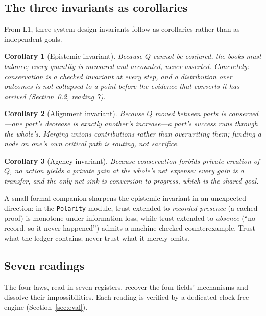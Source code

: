 \documentclass[11pt]{article}
\newtheorem{corollary}{Corollary}
\begin{document}
\subsection{The three invariants as corollaries}
\label{sec:invariants}

From L1, three system-design invariants follow as corollaries rather
than as independent goals.

\begin{corollary}[Epistemic invariant]
Because $Q$ cannot be conjured, the books must balance; every quantity
is measured and accounted, never asserted. Concretely: conservation is
a checked invariant at every step, and a distribution over outcomes is
not collapsed to a point before the evidence that converts it has
arrived (Section~\ref{sec:readings}, reading 7).
\end{corollary}

\begin{corollary}[Alignment invariant]
Because $Q$ moved between parts is conserved---one part's decrease is
exactly another's increase---a part's success runs through the whole's.
Merging unions contributions rather than overwriting them; funding a
node on one's own critical path is routing, not sacrifice.
\end{corollary}

\begin{corollary}[Agency invariant]
Because conservation forbids private creation of $Q$, no action yields
a private gain at the whole's net expense: every gain is a transfer,
and the only net sink is conversion to progress, which is the shared
goal.
\end{corollary}

A small formal companion sharpens the epistemic invariant in an
unexpected direction: in the \texttt{Polarity} module, trust extended
to \emph{recorded presence} (a cached proof) is monotone under
information loss, while trust extended to \emph{absence} (``no record,
so it never happened'') admits a machine-checked counterexample. Trust
what the ledger contains; never trust what it merely omits.

\subsection{Seven readings}
\label{sec:readings}

The four laws, read in seven registers, recover the four fields'
mechanisms and dissolve their impossibilities. Each reading is verified
by a dedicated clock-free engine (Section~\ref{sec:eval}).
\end{document}

